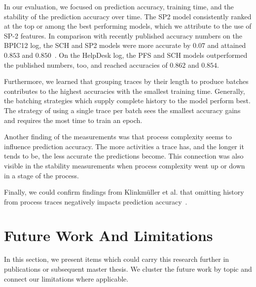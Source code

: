 In our evaluation, we focused on prediction accuracy, training time, and the stability of the prediction accuracy over time.
The SP2 model consistently ranked at the top or among the best performing models, which we attribute to the use of SP-2 features. In comparison with recently published accuracy numbers on the BPIC12 log, the SCH and SP2 models were more accurate by $0.07$ and attained $0.853$ and $0.850$~\cite{boehmer2018probability, evermann2016}.
On the HelpDesk log, the PFS and SCH models outperformed the published numbers, too, and reached accuracies of $0.862$ and $0.854$.

Furthermore, we learned that grouping traces by their length to produce batches contributes to the highest accuracies with the smallest training time.
Generally, the batching strategies which supply complete history to the model perform best.
The strategy of using a single trace per batch sees the smallest accuracy gains and requires the most time to train an epoch.

Another finding of the measurements was that process complexity seems to influence prediction accuracy.
The more activities a trace has, and the longer it tends to be, the less accurate the predictions become.
This connection was also visible in the stability measurements when process complexity went up or down in a stage of the process.

Finally, we could confirm findings from Klinkmüller et al. that omitting history from process traces negatively impacts prediction accuracy~\cite{klinkmuller2018reliablemonitoring}.

\section{Future Work And Limitations}\label{sec:conclusion:future-work}
In this section, we present items which could carry this research further in publications or subsequent master thesis.
We cluster the future work by topic and connect our limitations where applicable.

